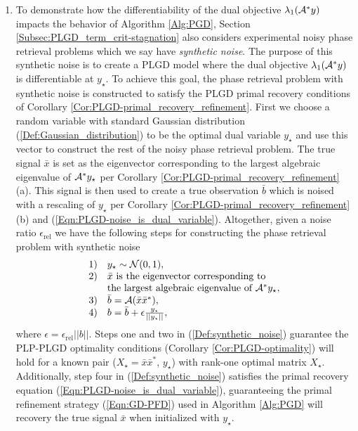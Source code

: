 \begin{enumerate}
\item

To demonstrate how the differentiability of the dual objective $\lambda_1({\mathcal A}^*y)$ impacts the behavior of Algorithm \ref{Alg:PGD}, Section \ref{Subsec:PLGD_term_crit-stagnation} also considers experimental noisy phase retrieval problems which we say have \textit{synthetic noise}.
The purpose of this synthetic noise is to create a PLGD model where the dual objective $\lambda_1({\mathcal A}^*y)$ is differentiable at $y_\star$.  
To achieve this goal, the phase retrieval problem with synthetic noise is constructed to satisfy the PLGD primal recovery conditions of Corollary \ref{Cor:PLGD-primal_recovery_refinement}.  First we choose a random variable with standard Gaussian distribution (\ref{Def:Gaussian_distribution}) to be the optimal dual variable $y_\star$ and use this vector to construct the rest of the noisy phase retrieval problem.  The true signal $\bar{x}$ is set as the eigenvector corresponding to the largest algebraic eigenvalue of ${\mathcal A}^*y_\star$ per Corollary \ref{Cor:PLGD-primal_recovery_refinement} (a).  This signal is then used to create a true observation $\bar{b}$ which is noised with a rescaling of $y_\star$ per Corollary \ref{Cor:PLGD-primal_recovery_refinement} (b) and  (\ref{Eqn:PLGD-noise_is_dual_variable}).  Altogether, given a noise ratio $\epsilon_\text{rel}$ we have the following steps for constructing the phase retrieval problem with synthetic noise
\begin{equation} 			\label{Def:synthetic_noise}
\begin{array}{ll}
1)	&	y_\star \sim {\mathcal N}(0,1), 	\\
2) & \bar{x} \text{ is the eigenvector corresponding to } \\
	&	\text{the largest algebraic eigenvalue of } {\mathcal A}^*y_\star, \\
3) & \bar{b} = {\mathcal A}(\bar{x}\bar{x}^*), \\
4) & b = \bar{b} + \epsilon \frac{y_\star}{|| y_\star ||},
\end{array}
\end{equation}
where $\epsilon = \epsilon_\text{rel}||b||$.  
Steps one and two in (\ref{Def:synthetic_noise}) guarantee the PLP-PLGD optimality conditions (Corollary \ref{Cor:PLGD-optimality}) will hold for a known pair ($X_\star = \bar{x}\bar{x}^*$, $y_\star$) with rank-one optimal matrix $X_\star$.  
Additionally, step four in (\ref{Def:synthetic_noise}) satisfies the primal recovery equation (\ref{Eqn:PLGD-noise_is_dual_variable}), guaranteeing the primal refinement strategy (\ref{Eqn:GD-PFD}) used in Algorithm \ref{Alg:PGD} will recovery the true signal $\bar{x}$ when initialized with $y_\star$.

\end{enumerate}
